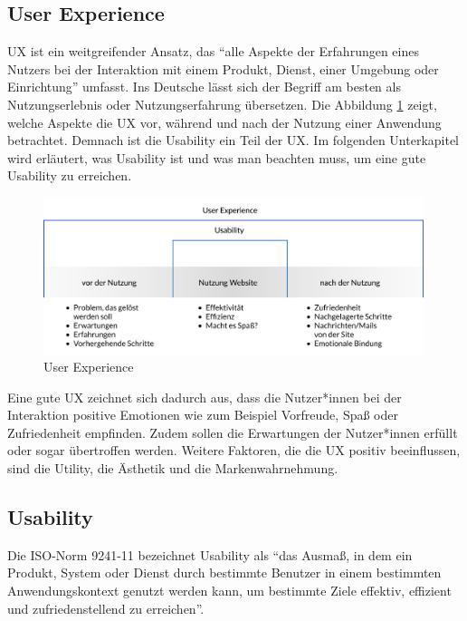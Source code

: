 \subsection{User Experience}

 \ac{UX} ist ein weitgreifender Ansatz, das \enquote{alle Aspekte der Erfahrungen eines Nutzers bei der Interaktion mit einem Produkt, Dienst, einer Umgebung oder Einrichtung} umfasst.
Ins Deutsche lässt sich der Begriff am besten als Nutzungserlebnis oder Nutzungserfahrung übersetzen. \citep[vgl.]{jacobsen_praxisbuch_2019}
Die Abbildung \ref{fig:abb2} zeigt, welche Aspekte die \ac{UX} vor, während und nach der Nutzung einer Anwendung betrachtet.
Demnach ist die Usability ein Teil der \ac{UX}.
Im folgenden Unterkapitel wird erläutert, was Usability ist und was man beachten muss, um eine gute Usability zu erreichen.

\begin{figure}[h]
	\centering
    	\includegraphics[width=0.99\textwidth]{Images/User_Experience.png}
   	\caption{User Experience}
   	\label{fig:abb2}
\end{figure}

Eine gute \ac{UX} zeichnet sich dadurch aus, dass die Nutzer*innen bei der Interaktion positive Emotionen wie zum Beispiel Vorfreude, Spaß oder Zufriedenheit empfinden.
Zudem sollen die Erwartungen der Nutzer*innen erfüllt oder sogar übertroffen werden.
Weitere Faktoren, die die \ac{UX} positiv beeinflussen, sind die Utility, die Ästhetik und die Markenwahrnehmung. \citep[vgl.]{weichert_quick_2021}

\subsection{Usability}

Die ISO-Norm 9241-11 bezeichnet Usability als \enquote{das Ausmaß, in dem ein Produkt, System oder Dienst durch bestimmte Benutzer in einem bestimmten Anwendungskontext genutzt werden kann, um bestimmte Ziele effektiv, effizient und zufriedenstellend zu erreichen}.

